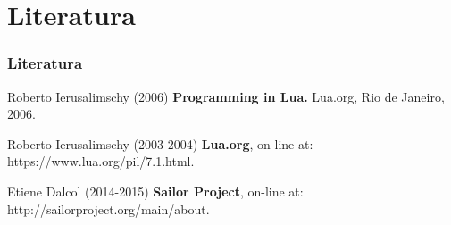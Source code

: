 \documentclass{beamer}
\begin{document}
\section{Literatura}

\begin{frame}
\frametitle{Literatura}
\footnotesize{
\begin{thebibliography}{99}

 Roberto Ierusalimschy (2006)
\newblock \small{\textbf{Programming in Lua.} Lua.org, Rio de Janeiro, 2006.}

 Roberto Ierusalimschy (2003-2004)
\newblock \small{\textbf{Lua.org}, on-line at: https://www.lua.org/pil/7.1.html.}

 Etiene Dalcol (2014-2015)
\newblock \small{\textbf{Sailor Project}, on-line at: http://sailorproject.org/main/about.}

\end{thebibliography}
}
\end{frame}
\end{document}
